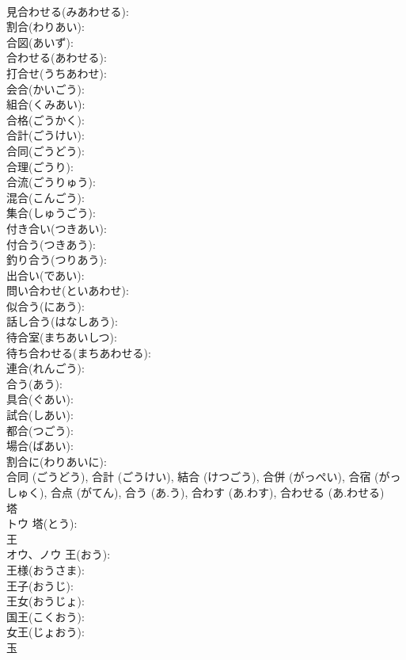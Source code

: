 \documentclass[8pt]{extreport}
\begin{document}
\begin{CJK}{UTF8}{min}
\\	見合わせる(みあわせる): 
\\	割合(わりあい): 
\\	合図(あいず): 
\\	合わせる(あわせる): 
\\	打合せ(うちあわせ): 
\\	会合(かいごう): 
\\	組合(くみあい): 
\\	合格(ごうかく): 
\\	合計(ごうけい): 
\\	合同(ごうどう): 
\\	合理(ごうり): 
\\	合流(ごうりゅう): 
\\	混合(こんごう): 
\\	集合(しゅうごう): 
\\	付き合い(つきあい): 
\\	付合う(つきあう): 
\\	釣り合う(つりあう): 
\\	出合い(であい): 
\\	問い合わせ(といあわせ): 
\\	似合う(にあう): 
\\	話し合う(はなしあう): 
\\	待合室(まちあいしつ): 
\\	待ち合わせる(まちあわせる): 
\\	連合(れんごう): 
\\	合う(あう): 
\\	具合(ぐあい): 
\\	試合(しあい): 
\\	都合(つごう): 
\\	場合(ばあい): 
\\	割合に(わりあいに): 
\\	合同 (ごうどう), 合計 (ごうけい), 結合 (けつごう), 合併 (がっぺい), 合宿 (がっしゅく), 合点 (がてん), 合う (あ.う), 合わす (あ.わす), 合わせる (あ.わせる)
\\	塔			
\\	トウ		塔(とう): 
\\	王			
\\	オウ、ノウ		王(おう): 
\\	王様(おうさま): 
\\	王子(おうじ): 
\\	王女(おうじょ): 
\\	国王(こくおう): 
\\	女王(じょおう): 
\\	玉			

\end{CJK}
\end{document}
